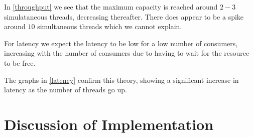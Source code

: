 \documentclass[11pt,a4paper]{article}
\begin{document}
In \autoref{throughput} we see that the maximum capacity is reached around
$2-3$ simulataneous threads, decreasing thereafter. There does appear to be a
spike around $10$ simultaneous threads which we cannot explain.

For latency we expect the latency to be low for a low number of
consumers, increasing with the number of consumers due to having to wait for
the resource to be free.

The graphs in \autoref{latency} confirm this theory, showing a significant
increase in latency as the number of threads go up.

\section{Discussion of Implementation}
\end{document}
